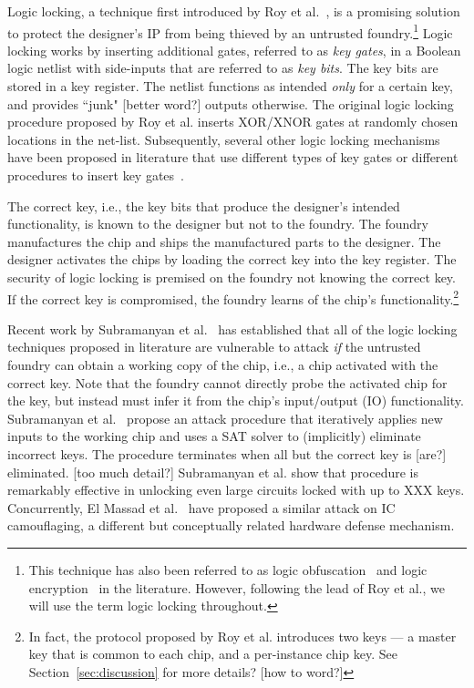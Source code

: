 Logic locking, a technique first introduced by Roy et al.~\cite{roy2008epic}, 
is a promising solution to protect the designer's IP from 
being thieved by an untrusted foundry.\footnote{This technique has 
also been referred to as logic obfuscation~\cite{} and logic encryption~\cite{} in the literature. However, following the lead of Roy et al., we will use the term logic locking throughout.}  
Logic locking works by inserting 
additional gates, referred to as \emph{key gates}, 
in a Boolean 
logic netlist with 
side-inputs that are referred to as \emph{key bits}. The key bits 
are 
stored in a key register. 
The netlist functions as intended \emph{only} 
for a certain key, and provides ``junk" [better word?]
outputs otherwise. 
The original logic locking procedure proposed by Roy et al. 
inserts XOR/XNOR gates at randomly chosen locations in the 
net-list. Subsequently, several other logic locking mechanisms have been proposed in literature that use different types of key gates or 
different procedures to insert key gates~\cite{}. 

The correct key, i.e., 
the key bits that produce the designer's intended 
functionality, 
is known to the designer but not to the foundry. The foundry manufactures the chip and ships the manufactured parts to the 
designer. The designer activates the chips by loading the 
correct key into the key register. 
The security of logic locking 
is premised on the foundry not knowing the correct key.
If the correct key is compromised, the foundry learns of the 
chip's functionality.\footnote{In fact, the protocol proposed by Roy et al. introduces two keys --- a master key that is common to each chip, and a per-instance chip key. See Section~\ref{sec:discussion} for more details? [how to word?]} 

  
Recent work by Subramanyan et al.~\cite{} has 
established 
that all
of the logic locking techniques proposed in literature
are vulnerable to attack \emph{if} the 
untrusted foundry can obtain a 
working copy of the chip, i.e., 
a chip activated with the correct key. 
Note that the foundry cannot directly 
probe the activated chip for the key, but instead 
must infer it from 
the chip's input/output (IO) functionality.   
Subramanyan
et al.~\cite{} propose an attack procedure that 
iteratively applies new inputs to the working chip and 
uses a SAT solver to 
(implicitly) eliminate incorrect keys. 
The procedure terminates when 
all but the correct key is [are?] eliminated. 
[too much detail?]
Subramanyan et al. show that procedure is 
remarkably effective in unlocking even large circuits locked 
with up to XXX keys. Concurrently, El Massad et al.~\cite{} 
have proposed a similar attack on IC camouflaging, 
a different but conceptually related hardware 
defense mechanism.

